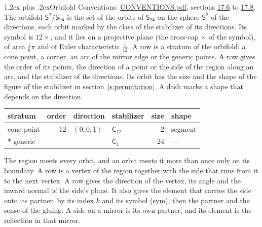 \documentclass[10pt,a4paper]{article}
\makeatletter
\renewcommand\section{\@startsection{section}{1}{\z@}{-3ex plus -1ex minus -.2ex}%
  {1.2ex plus .2ex}{\normalfont\large\sffamily\bfseries\color{parttitle}}}
\numberwithin{equation}{section}
\newcommand{\grp}[1]{\mathsf{#1}}
\newcommand{\orbname}[1]{#1}
\newcommand{\dirvec}[3]{(#1, #2, #3)}
\newcommand{\twosphere}{\mathsf{S}^{2}}
\makeatother
\begin{document}
\section{Orbifold}\label{s:orbifold}
Conventions: \href{../../CONVENTIONS.pdf}{CONVENTIONS.pdf}, sections \href{../../CONVENTIONS.pdf\#conv.17.6}{17.6} to \href{../../CONVENTIONS.pdf\#conv.17.8}{17.8}.
The orbifold $\twosphere/\grp{S_{24}}$ is the set of the orbits of $\grp{S_{24}}$ on the sphere $\twosphere$ of the directions, each orbit marked by the class of the stabilizer of its directions. Its symbol is $\orbname{12{\times}}$, and it lies on a projective plane (the cross-cap ${\times}$ of the symbol), of area $\tfrac{1}{6}\pi$ and of Euler characteristic $\tfrac{1}{12}$.
\leavevmode\label{n:head.stratum}\label{n:head.order.point}\label{n:head.direction}\label{n:head.stabilizer}\label{n:head.size.orbit}\label{n:head.shape}A row is a stratum of the orbifold: a cone point, a corner, an arc of the mirror edge or the generic points. A row gives the order of its points, the direction of a point or the side of the region along an arc, and the stabilizer of its directions. Its orbit has the size and the shape of the figure of the stabilizer in section~\ref{s:permutation}. A dash marks a shape that depends on the direction.
{\small\setlength{\tabcolsep}{4pt}\begin{longtable}{@{}lrllrl@{}}\toprule
stratum & order & direction & stabilizer & size & shape\\\midrule\endhead
\bottomrule\endfoot\endlastfoot
cone point & 12 & $\dirvec{0}{0}{1}$ & \href{C12.pdf}{$\grp{C_{12}}$} & 2 & segment\\*
generic &  &  & \href{C1.pdf}{$\grp{C_{1}}$} & 24 & ---\\
\bottomrule\end{longtable}}
\leavevmode\label{n:head.vertex.region}\label{n:head.angle}\label{n:head.normal.side}\label{n:head.partner}\label{n:head.sense}The region meets every orbit, and an orbit meets it more than once only on its boundary. A row is a vertex of the region together with the side that runs from it to the next vertex. A row gives the direction of the vertex, its angle and the inward normal of the side's plane. It also gives the element that carries the side onto its partner, by its index $k$ and its symbol (sym), then the partner and the sense of the gluing. A side on a mirror is its own partner, and its element is the reflection in that mirror.
\end{document}
